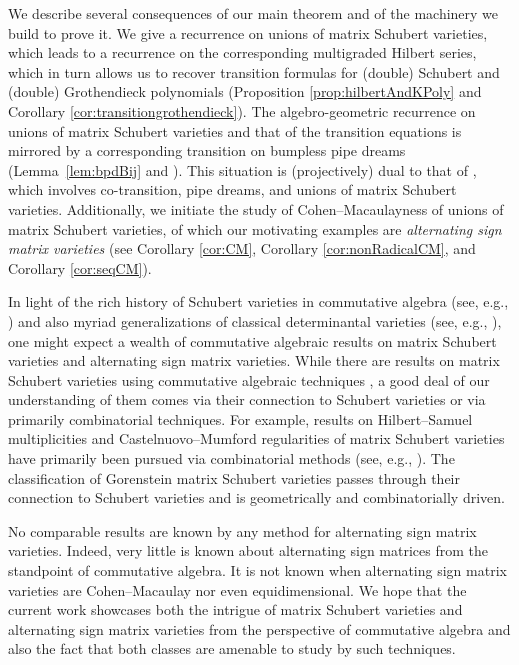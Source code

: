 \documentclass[12pt,reqno]{amsart}
\newtheorem{Main Conjecture}[theorem]{Main Conjecture}
\theoremstyle{remark}
\theoremstyle{plain}
\begin{document}
We describe several consequences of our main theorem and of the machinery we build to prove it.  We give a recurrence on unions of matrix Schubert varieties, which leads to a recurrence on the corresponding multigraded Hilbert series, which in turn allows us to recover transition formulas for (double) Schubert and (double) Grothendieck polynomials (Proposition \ref{prop:hilbertAndKPoly} and Corollary \ref{cor:transitiongrothendieck}).  The algebro-geometric recurrence on unions of matrix Schubert varieties and that of the transition equations is mirrored by a corresponding transition on bumpless pipe dreams (Lemma~\ref{lem:bpdBij} and \cite[Section~5]{Wei21}).  This situation is (projectively) dual to that of \cite{Knu19}, which involves co-transition, pipe dreams, and unions of matrix Schubert varieties. Additionally, we initiate the study of Cohen--Macaulayness of unions of matrix Schubert varieties, of which our motivating examples are \emph{alternating sign matrix varieties} (see Corollary \ref{cor:CM}, Corollary \ref{cor:nonRadicalCM}, and Corollary \ref{cor:seqCM}).  

In light of the rich history of Schubert varieties in commutative algebra (see, e.g., \cite{HE71,Hoc73, DL81, HL82, MS83,    MR85,Ram85,Ram87, MS89, GL96, GM00}) and also myriad generalizations of classical determinantal varieties (see, e.g., \cite{HT92,Con96, CH97,BC98, Con98, LRT06, Gor07, Boo12, EHH13, Ber15, CDG20, FK20, CDF+21}), one might expect a wealth of commutative algebraic results on matrix Schubert varieties and alternating sign matrix varieties.  While there are results on matrix Schubert varieties using  commutative algebraic techniques \cite{Hsi13}, a good deal of our understanding of them comes via their connection to Schubert varieties or via primarily combinatorial techniques. 
For example, results on Hilbert--Samuel multiplicities and Castelnuovo--Mumford regularities of matrix Schubert varieties have primarily been pursued via combinatorial methods (see, e.g., \cite{LY12, WY12, PSW21, RRR+21, RRW23}).  The classification of Gorenstein matrix Schubert varieties \cite{WY06} passes through their connection to Schubert varieties and is geometrically and combinatorially driven. 

No comparable results are known by any method for alternating sign matrix varieties.  Indeed, very little is known about alternating sign matrices from the standpoint of commutative algebra.  It is not known when alternating sign matrix varieties are Cohen--Macaulay nor even equidimensional.  We hope that the current work showcases both the intrigue of matrix Schubert varieties and alternating sign matrix varieties from the perspective of commutative algebra and also 
the fact that both classes are amenable to study by such techniques. 
\end{document}
